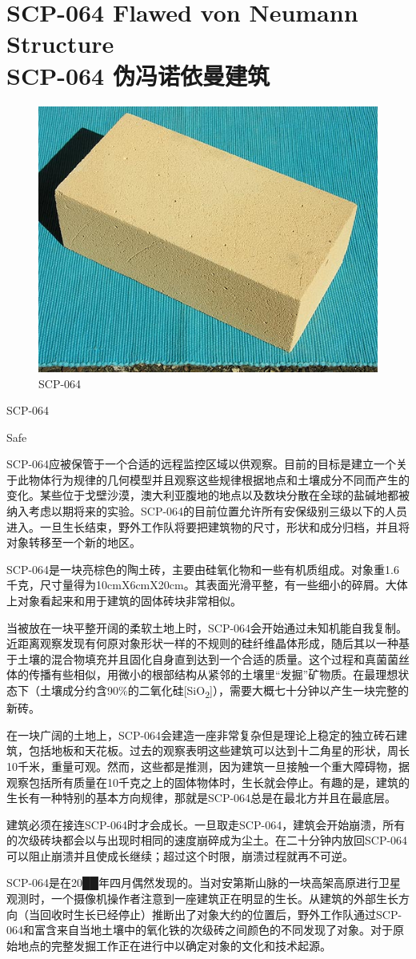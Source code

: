 \chapter[SCP-064 伪冯诺依曼建筑]{
    SCP-064 Flawed von Neumann Structure\\
    SCP-064 伪冯诺依曼建筑
}

\label{chap:SCP-064}

\begin{figure}[H]
    \centering
    \includegraphics[width=0.5\linewidth]{images/SCP-064.jpg}
    \caption*{SCP-064}
\end{figure}

SCP-064

Safe

SCP-064应被保管于一个合适的远程监控区域以供观察。目前的目标是建立一个关于此物体行为规律的几何模型并且观察这些规律根据地点和土壤成分不同而产生的变化。某些位于戈壁沙漠，澳大利亚腹地的地点以及数块分散在全球的盐碱地都被纳入考虑以期将来的实验。SCP-064的目前位置允许所有安保级别三级以下的人员进入。一旦生长结束，野外工作队将要把建筑物的尺寸，形状和成分归档，并且将对象转移至一个新的地区。

SCP-064是一块亮棕色的陶土砖，主要由硅氧化物和一些有机质组成。对象重1.6千克，尺寸量得为10cmX6cmX20cm。其表面光滑平整，有一些细小的碎屑。大体上对象看起来和用于建筑的固体砖块非常相似。

当被放在一块平整开阔的柔软土地上时，SCP-064会开始通过未知机能自我复制。近距离观察发现有何原对象形状一样的不规则的硅纤维晶体形成，随后其以一种基于土壤的混合物填充并且固化自身直到达到一个合适的质量。这个过程和真菌菌丝体的传播有些相似，用微小的根部结构从紧邻的土壤里“发掘”矿物质。在最理想状态下（土壤成分约含90\%的二氧化硅{[}SiO\textsubscript{2}]），需要大概七十分钟以产生一块完整的新砖。

在一块广阔的土地上，SCP-064会建造一座非常复杂但是理论上稳定的独立砖石建筑，包括地板和天花板。过去的观察表明这些建筑可以达到十二角星的形状，周长10千米，重量可观。然而，这些都是推测，因为建筑一旦接触一个重大障碍物，据观察包括所有质量在10千克之上的固体物体时，生长就会停止。有趣的是，建筑的生长有一种特别的基本方向规律，那就是SCP-064总是在最北方并且在最底层。

建筑必须在接连SCP-064时才会成长。一旦取走SCP-064，建筑会开始崩溃，所有的次级砖块都会以与出现时相同的速度崩碎成为尘土。在二十分钟内放回SCP-064可以阻止崩溃并且使成长继续；超过这个时限，崩溃过程就再不可逆。

SCP-064是在20██年四月偶然发现的。当对安第斯山脉的一块高架高原进行卫星观测时，一个摄像机操作者注意到一座建筑正在明显的生长。从建筑的外部生长方向（当回收时生长已经停止）推断出了对象大约的位置后，野外工作队通过SCP-064和富含来自当地土壤中的氧化铁的次级砖之间颜色的不同发现了对象。对于原始地点的完整发掘工作正在进行中以确定对象的文化和技术起源。
